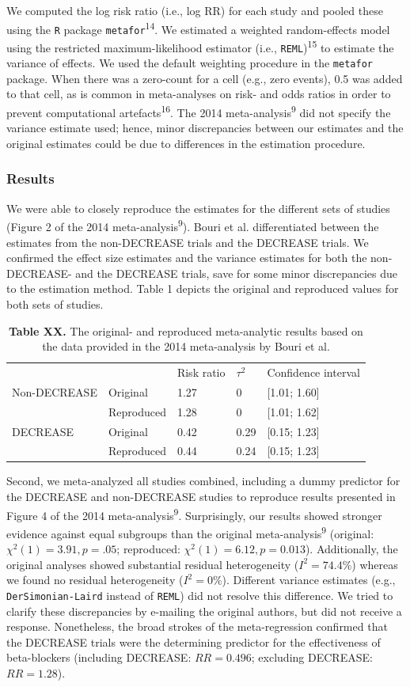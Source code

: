 \documentclass[]{article}
\begin{document}
We computed the log risk ratio (i.e., log RR) for each study and pooled
these using the \texttt{R} package \texttt{metafor}\textsuperscript{14}.
We estimated a weighted random-effects model using the restricted
maximum-likelihood estimator (i.e., \texttt{REML})\textsuperscript{15}
to estimate the variance of effects. We used the default weighting
procedure in the \texttt{metafor} package. When there was a zero-count
for a cell (e.g., zero events), 0.5 was added to that cell, as is common
in meta-analyses on risk- and odds ratios in order to prevent
computational artefacts\textsuperscript{16}. The 2014
meta-analysis\textsuperscript{9} did not specify the variance estimate
used; hence, minor discrepancies between our estimates and the original
estimates could be due to differences in the estimation procedure.

\subsubsection{Results}\label{results}

We were able to closely reproduce the estimates for the different sets
of studies (Figure 2 of the 2014 meta-analysis\textsuperscript{9}).
Bouri et al. differentiated between the estimates from the non-DECREASE
trials and the DECREASE trials. We confirmed the effect size estimates
and the variance estimates for both the non-DECREASE- and the DECREASE
trials, save for some minor discrepancies due to the estimation method.
Table 1 depicts the original and reproduced values for both sets of
studies.

\begin{longtable}[]{@{}lllll@{}}
\caption{\textbf{Table XX.} The original- and reproduced meta-analytic
results based on the data provided in the 2014 meta-analysis by Bouri et
al.}\tabularnewline
\toprule
& & Risk ratio & \(\tau^2\) & Confidence interval\tabularnewline
Non-DECREASE & Original & 1.27 & 0 & {[}1.01; 1.60{]}\tabularnewline
& Reproduced & 1.28 & 0 & {[}1.01; 1.62{]}\tabularnewline
DECREASE & Original & 0.42 & 0.29 & {[}0.15; 1.23{]}\tabularnewline
& Reproduced & 0.44 & 0.24 & {[}0.15; 1.23{]}\tabularnewline
\bottomrule
\end{longtable}

Second, we meta-analyzed all studies combined, including a dummy
predictor for the DECREASE and non-DECREASE studies to reproduce results
presented in Figure 4 of the 2014 meta-analysis\textsuperscript{9}.
Surprisingly, our results showed stronger evidence against equal
subgroups than the original meta-analysis\textsuperscript{9} (original:
\(\chi^2(1)=3.91,p=.05\); reproduced: \(\chi^2(1)=6.12,p=0.013\)).
Additionally, the original analyses showed substantial residual
heterogeneity (\(I^2=74.4\)\%) whereas we found no residual
heterogeneity (\(I^2=0\)\%). Different variance estimates (e.g.,
\texttt{DerSimonian-Laird} instead of \texttt{REML}) did not resolve
this difference. We tried to clarify these discrepancies by e-mailing
the original authors, but did not receive a response. Nonetheless, the
broad strokes of the meta-regression confirmed that the DECREASE trials
were the determining predictor for the effectiveness of beta-blockers
(including DECREASE: \(RR=0.496\); excluding DECREASE: \(RR=1.28\)).
\end{document}
